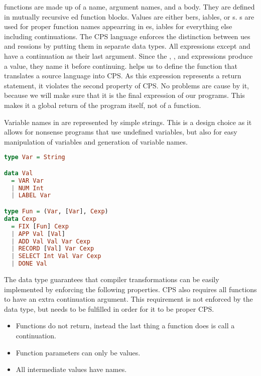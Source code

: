 { functions are made up of a name, argument names, and a body. They are defined in mutually recursive ed function blocks. Values are either bers, iables, or s. s are used for proper function names appearring in es, iables for everything else including continuations. The \ac{CPS} language enforces the distinction between ues and ressions by putting them in separate data types. All expressions except  and  have a  continuation as their last argument. Since the , , and  expressions produce a value, they name it before continuing.  helps us to define the function that translates a source language into \ac{CPS}. As this expression represents a return statement, it violates the second property of \ac{CPS}. No problems are cause by it, because we will make sure that it is the final expression of our programs. This makes it a global return of the program itself, not of a function.

Variable names in  are represented by simple strings. This is a design choice as it allows for nonsense programs that use undefined variables, but also for easy manipulation of variables and generation of variable names.

\begin{lstlisting}[language=Haskell]
type Var = String

data Val
  = VAR Var
  | NUM Int
  | LABEL Var

type Fun = (Var, [Var], Cexp)
data Cexp
  = FIX [Fun] Cexp
  | APP Val [Val]
  | ADD Val Val Var Cexp
  | RECORD [Val] Var Cexp
  | SELECT Int Val Var Cexp
  | DONE Val
\end{lstlisting}

The  data type guarantees that compiler transformations can be easily implemented by enforcing the following properties. \ac{CPS} also requires all functions to have an extra continuation argument. This requirement is not enforced by the data type, but needs to be fulfilled in order for it to be proper \ac{CPS}.

\begin{itemize}
\item Functions do not return, instead the last thing a function does is call a continuation.
\item Function parameters can only be values.
\item All intermediate values have names.
\end{itemize}

}
